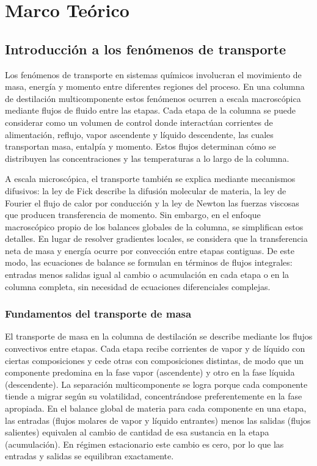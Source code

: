 \section{Marco Teórico}
\subsection{Introducción a los fenómenos de transporte}
Los fenómenos de transporte en sistemas químicos involucran el movimiento de masa, energía y momento entre diferentes regiones del proceso. En una columna de destilación multicomponente estos fenómenos ocurren a escala macroscópica mediante flujos de fluido entre las etapas. Cada etapa de la columna se puede considerar como un volumen de control donde interactúan corrientes de alimentación, reflujo, vapor ascendente y líquido descendente, las cuales transportan masa, entalpía y momento. Estos flujos determinan cómo se distribuyen las concentraciones y las temperaturas a lo largo de la columna.

A escala microscópica, el transporte también se explica mediante mecanismos difusivos: la ley de Fick describe la difusión molecular de materia, la ley de Fourier el flujo de calor por conducción y la ley de Newton las fuerzas viscosas que producen transferencia de momento. Sin embargo, en el enfoque macroscópico propio de los balances globales de la columna, se simplifican estos detalles. En lugar de resolver gradientes locales, se considera que la transferencia neta de masa y energía ocurre por convección entre etapas contiguas. De este modo, las ecuaciones de balance se formulan en términos de flujos integrales: entradas menos salidas igual al cambio o acumulación en cada etapa o en la columna completa, sin necesidad de ecuaciones diferenciales complejas.

\subsubsection{Fundamentos del transporte de masa}
El transporte de masa en la columna de destilación se describe mediante los flujos convectivos entre etapas. Cada etapa recibe corrientes de vapor y de líquido con ciertas composiciones y cede otras con composiciones distintas, de modo que un componente predomina en la fase vapor (ascendente) y otro en la fase líquida (descendente). La separación multicomponente se logra porque cada componente tiende a migrar según su volatilidad, concentrándose preferentemente en la fase apropiada. En el balance global de materia para cada componente en una etapa, las entradas (flujos molares de vapor y líquido entrantes) menos las salidas (flujos salientes) equivalen al cambio de cantidad de esa sustancia en la etapa (acumulación). En régimen estacionario este cambio es cero, por lo que las entradas y salidas se equilibran exactamente.

